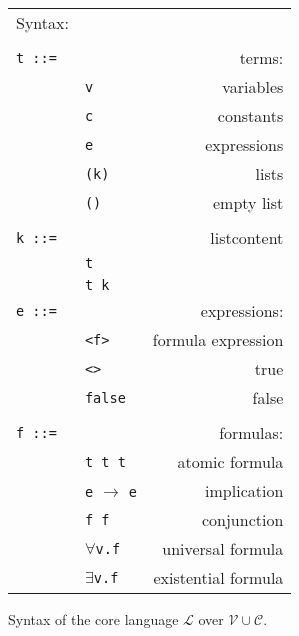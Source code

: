 \begin{figure}

\begin{tabular}{llr}
\hline
Syntax: &&\\
&&\\
\texttt{t ::=}&&                    terms:\\
      & \texttt{v}\hspace{0.15\textwidth} &                variables\\
      & \texttt{c} &                constants\\
      & \texttt{e} &                 expressions\\
      & \texttt{(k)}& lists\\
      & \texttt{()}& empty list\\
      &&\\
\texttt{k ::=}&&                    listcontent\\  
       &\texttt{t}  &\\
       &\texttt{t k}&\\
\texttt{e ::=}&&                    expressions:\\
       &\texttt{<f>} &               formula expression\\
       &\texttt{<>} & true\\
       &\texttt{false}       &               false\\
       &&\\
\texttt{f ::= } & &                   formulas:\\  
    &  \texttt{t t t}&                atomic formula\\
    &  \texttt{e} $\rightarrow$ \texttt{e}& implication\\
    &  \texttt{f f} &                 conjunction\\
    &  \(\forall\)\texttt{v.f}     & universal formula\\
    &  \(\exists\)\texttt{v.f}     & existential formula\\
    \hline
\end{tabular}
\caption{Syntax of the core language $\mathcal{L}$ over $\mathcal{V}\cup\mathcal{C}$.\label{syntax}}
\end{figure}

